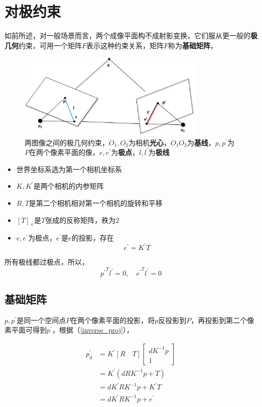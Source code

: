 \section{对极约束}
	如前所述，对一般场景而言，两个成像平面构不成射影变换，它们服从更一般的\textbf{极几何}约束，可用一个矩阵$F$表示这种约束关系，矩阵$F$称为\textbf{基础矩阵}，
	\begin{figure}[H]
		\begin{center}
			\includegraphics[width=0.8\textwidth]{../images/base_matrix.png}
		\end{center}
		\caption{两图像之间的极几何约束，$O_1,O_2$为相机\textbf{光心}，$O_1O_2$为\textbf{基线}，$p,p^{\prime}$为$P$在两个像素平面的像，$e,e^\prime$为\textbf{极点}，$l,l^{\prime}$为\textbf{极线}}
	\end{figure}
	\begin{itemize}
		\item 世界坐标系选为第一个相机坐标系
		\item $K,K^{\prime}$是两个相机的内参矩阵
		\item $R,T$是第二个相机相对第一个相机的旋转和平移
		\item $[T]_{\times}$是$T$张成的反称矩阵，秩为$2$
		\item $e,e^\prime$为极点，$e^\prime$是$e$的投影，存在
			$$
				e^\prime =K^\prime T
			$$	
	\end{itemize}

	所有极线都过极点，所以，
	$$
		{p^\prime}^T l^\prime = 0, \quad {e^\prime}^T l^\prime = 0
	$$
	\subsection*{基础矩阵}
		$p,p^\prime$是同一个空间点$P$在两个像素平面的投影，将$p$反投影到$P$，再投影到第二个像素平面可得到$p^\prime$，根据（\ref{inverse_proj}），

		\begin{align}
			p^{\prime}_d &= K^{\prime}[R\quad T]
			\begin{bmatrix}
				dK^{-1}p\\
				1
			\end{bmatrix}\nonumber\\
			&= K^{\prime}\left(dRK^{-1}p + T\right)\nonumber\\
			&= dK^{\prime}RK^{-1}p + K^{\prime}T\label{f_inverse}\\
			&= dK^{\prime}RK^{-1}p + e^\prime\label{f_inverse_e}
		\end{align}

